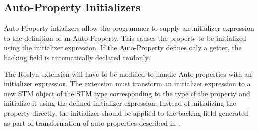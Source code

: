 \subsection{Auto-Property Initializers}
Auto-Property intializers allow the programmer to supply an initializer expression to the definition of an Auto-Property\cite{csharp6one}\cite{csharp6two}\cite{csharp6featureDescription}. This causes the property  to be initialized using the initializer expression. If the Auto-Property defines only a getter, the backing field is automatically declared readonly\cite{csharp6one}\cite{csharp6featureDescription}. 

The Roslyn extension will have to be modified to handle  Auto-properties with an initializer expression. The extension must transform an initializer expression to a new \ac{STM} object of the \ac{STM} type corresponding to the type of the  property and initialize it using the defined initializer expression. Instead of initializing the property directly, the initializer should be applied to the backing field generated as part of transformation of  auto properties described in .

\worksheetend
